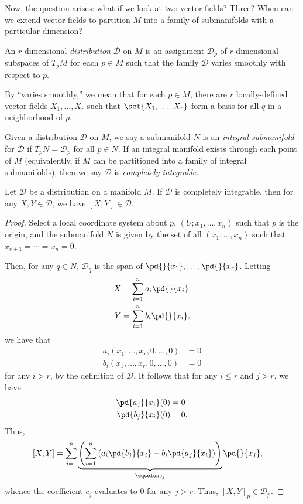 \documentclass[10pt]{mypackage}
\begin{document}
Now, the question arises: what if we look at two vector fields? Three? When can we extend vector fields to partition $M$ into a family of submanifolds with a particular dimension?
\begin{definition}
  An $r$-dimensional \textit{distribution} $\mathcal{D}$ on $M$ is an assignment $ \mathcal{D}_p $ of $r$-dimensional subspaces of $T_pM$ for each $p\in M$ such that the family $ \mathcal{D} $ varies smoothly with respect to $p$.\newline

  By ``varies smoothly,'' we mean that for each $p\in M$, there are $r$ locally-defined vector fields $X_1,\dots,X_r$ such that $\set{X_1,\dots,X_r}$ form a basis for all $q$ in a neighborhood of $p$.
\end{definition}
\begin{definition}
  Given a distribution $\mathcal{D}$ on $M$, we say a submanifold $N$ is an \textit{integral submanifold} for $\mathcal{D}$ if $T_pN = \mathcal{D}_p$ for all $p\in N$. If an integral manifold exists through each point of $M$ (equivalently, if $M$ can be partitioned into a family of integral submanifolds), then we say $ \mathcal{D} $ is \textit{completely integrable}.
\end{definition}
\begin{proposition}
  Let $\mathcal{D}$ be a distribution on a manifold $M$. If $ \mathcal{D} $ is completely integrable, then for any $X,Y\in \mathcal{D}$, we have $ \left[ X,Y \right]\in \mathcal{D} $.
\end{proposition}
\begin{proof}
  Select a local coordinate system about $p$, $ \left( U;x_1,\dots,x_n \right) $ such that $p$ is the origin, and the submanifold $N$ is given by the set of all $\left( x_1,\dots,x_n \right)$ such that $x_{r+1} = \cdots = x_n = 0$.\newline

  Then, for any $q\in N$, $\mathcal{D}_q$ is the span of $ \pd{}{x_1},\dots, \pd{}{x_r} $. Letting
  \begin{align*}
    X &= \sum_{i=1}^{n} a_i \pd{}{x_i}\\
    Y &= \sum_{i=1}^{n} b_i\pd{}{x_i},
  \end{align*}
  we have that
  \begin{align*}
    a_i \left( x_1,\dots,x_r,0,\dots,0 \right) &= 0\\
    b_i \left( x_1,\dots,x_r,0,\dots,0 \right) &= 0
  \end{align*}
  for any $i > r$, by the definition of $ \mathcal{D} $. It follows that for any $i \leq r$ and $ j> r $, we have
  \begin{align*}
    \pd{a_j}{x_i}(0) &= 0\\
    \pd{b_j}{x_i}(0) &= 0.
  \end{align*}
  Thus,
  \begin{align*}
    \left[ X,Y \right] &= \sum_{j=1}^{n}\underbrace{\left( \sum_{i=1}^{n} \left( a_i \pd{b_j}{x_i} - b_i \pd{a_j}{x_i} \right) \right)}_{\eqcolon c_j} \pd{}{x_j},
  \end{align*}
  whence the coefficient $c_j$ evaluates to $0$ for any $j > r$. Thus, $\left[ X,Y \right]_{p}\in \mathcal{D}_p$.
\end{proof}
\end{document}
